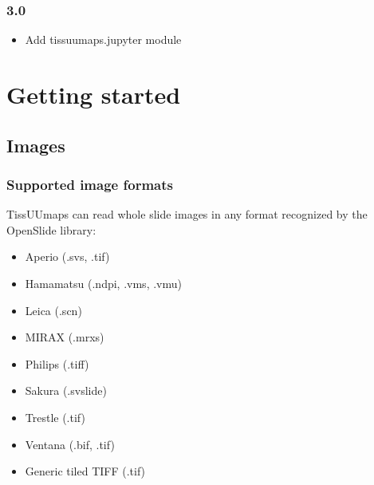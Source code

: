 \documentclass[letterpaper,10pt,english,openany,oneside]{sphinxmanual}
\begin{document}
\subsection{3.0}
\label{\detokenize{docs/intro/versions:id11}}\begin{itemize}
\item {} 
\sphinxAtStartPar
Add tissuumaps.jupyter module

\end{itemize}

\sphinxstepscope


\chapter{Getting started}
\label{\detokenize{docs/starting/index:getting-started}}\label{\detokenize{docs/starting/index::doc}}
\sphinxstepscope


\section{Images}
\label{\detokenize{docs/starting/images:images}}\label{\detokenize{docs/starting/images::doc}}

\subsection{Supported image formats}
\label{\detokenize{docs/starting/images:supported-image-formats}}
\sphinxAtStartPar
TissUUmaps can read whole slide images in any format recognized by the OpenSlide library:
\begin{itemize}
\item {} 
\sphinxAtStartPar
Aperio (.svs, .tif)

\item {} 
\sphinxAtStartPar
Hamamatsu (.ndpi, .vms, .vmu)

\item {} 
\sphinxAtStartPar
Leica (.scn)

\item {} 
\sphinxAtStartPar
MIRAX (.mrxs)

\item {} 
\sphinxAtStartPar
Philips (.tiff)

\item {} 
\sphinxAtStartPar
Sakura (.svslide)

\item {} 
\sphinxAtStartPar
Trestle (.tif)

\item {} 
\sphinxAtStartPar
Ventana (.bif, .tif)

\item {} 
\sphinxAtStartPar
Generic tiled TIFF (.tif)

\end{itemize}
\end{document}
